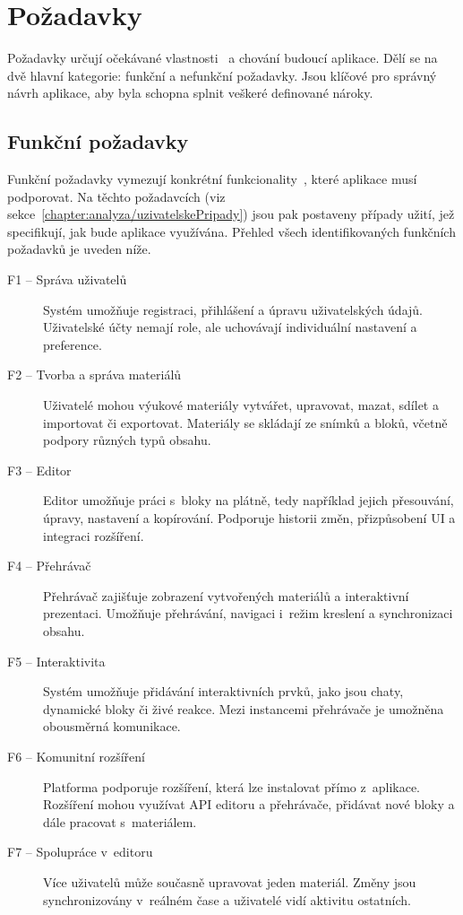 \section{Požadavky}

Požadavky určují očekávané vlastnosti~\cite{uml_2007} a chování budoucí aplikace. Dělí se na dvě hlavní kategorie: funkční a nefunkční požadavky. Jsou klíčové pro správný návrh aplikace, aby byla schopna splnit veškeré definované nároky.

\subsection{Funkční požadavky}

Funkční požadavky vymezují konkrétní funkcionality~\cite{uml_2007}, které aplikace musí podporovat. 
Na těchto požadavcích (viz sekce~\ref{chapter:analyza/uzivatelskePripady}) jsou pak postaveny případy užití, jež specifikují, jak bude aplikace využívána. 
Přehled všech identifikovaných funkčních požadavků je uveden níže.


\begin{description}
    \item[F1 -- Správa uživatelů]
    Systém umožňuje registraci, přihlášení a úpravu uživatelských údajů. Uživatelské účty nemají role, ale uchovávají individuální nastavení a preference.

    \item[F2 -- Tvorba a správa materiálů]
    Uživatelé mohou výukové materiály vytvářet, upravovat, mazat, sdílet a importovat či exportovat. Materiály se skládají ze snímků a bloků, včetně podpory různých typů obsahu.

    \item[F3 -- Editor]
    Editor umožňuje práci s~bloky na plátně, tedy například jejich přesouvání, úpravy, nastavení a kopírování. Podporuje historii změn, přizpůsobení UI a integraci rozšíření.

    \item[F4 -- Přehrávač]
    Přehrávač zajišťuje zobrazení vytvořených materiálů a interaktivní prezentaci. Umožňuje přehrávání, navigaci i~režim kreslení a synchronizaci obsahu.

    \item[F5 -- Interaktivita]
    Systém umožňuje přidávání interaktivních prvků, jako jsou chaty, dynamické bloky či živé reakce. Mezi instancemi přehrávače je umožněna obousměrná komunikace.

    \item[F6 -- Komunitní rozšíření]
    Platforma podporuje rozšíření, která lze instalovat přímo z~aplikace. Rozšíření mohou využívat API editoru a přehrávače, přidávat nové bloky a dále pracovat s~materiálem.

    \item[F7 -- Spolupráce v~editoru]
    Více uživatelů může současně upravovat jeden materiál. Změny jsou synchronizovány v~reálném čase a uživatelé vidí aktivitu ostatních.
\end{description}




